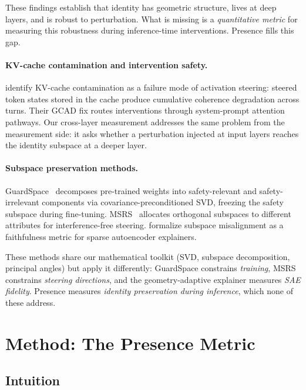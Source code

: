 \documentclass[11pt,a4paper]{article}
\begin{document}
These findings establish that identity has geometric structure, lives at deep
layers, and is robust to perturbation. What is missing is a
\emph{quantitative metric} for measuring this robustness during inference-time
interventions. Presence fills this gap.

\paragraph{KV-cache contamination and intervention safety.}
\citet{kang2026promptactivation} identify KV-cache contamination as a failure
mode of activation steering: steered token states stored in the cache produce
cumulative coherence degradation across turns. Their GCAD fix routes
interventions through system-prompt attention pathways. Our cross-layer
measurement addresses the same problem from the measurement side: it asks
whether a perturbation injected at input layers reaches the identity
subspace at a deeper layer.

\paragraph{Subspace preservation methods.}
GuardSpace~\citep{zhang2025guardspace} decomposes pre-trained weights into
safety-relevant and safety-irrelevant components via covariance-preconditioned
SVD, freezing the safety subspace during fine-tuning.
MSRS~\citep{jiang2025msrs} allocates orthogonal subspaces to different
attributes for interference-free steering.
\citet{lim2026geometry} formalize subspace misalignment as a faithfulness
metric for sparse autoencoder explainers.

These methods share our mathematical toolkit (SVD, subspace decomposition,
principal angles) but apply it differently: GuardSpace constrains
\emph{training}, MSRS constrains \emph{steering directions}, and the
geometry-adaptive explainer measures \emph{SAE fidelity}. Presence measures
\emph{identity preservation during inference}, which none of these address.

\section{Method: The Presence Metric}
\label{sec:method}

\subsection{Intuition}
\end{document}
